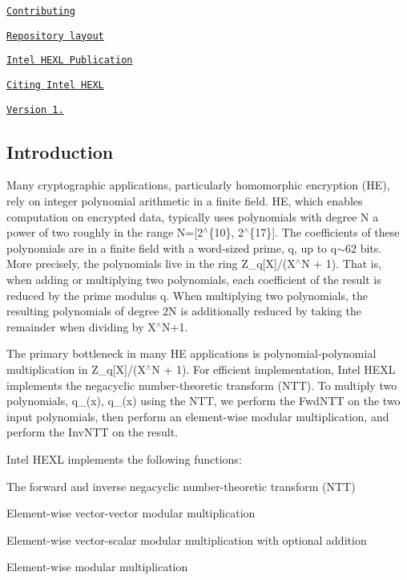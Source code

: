 \begin{DoxyItemize}
\item \href{#contributing}{\tt Contributing}
\begin{DoxyItemize}
\item \href{#repository-layout}{\tt Repository layout}
\item \href{#intel-hexl-publication}{\tt Intel H\+E\+XL Publication}
\item \href{#citing-intel-hexl}{\tt Citing Intel H\+E\+XL}
\begin{DoxyItemize}
\item \href{#version-10}{\tt Version 1.}
\end{DoxyItemize}
\end{DoxyItemize}
\end{DoxyItemize}

\subsection*{Introduction}

Many cryptographic applications, particularly homomorphic encryption (HE), rely on integer polynomial arithmetic in a finite field. HE, which enables computation on encrypted data, typically uses polynomials with degree {\ttfamily N} a power of two roughly in the range {\ttfamily N=\mbox{[}2$^\wedge$\{10\}, 2$^\wedge$\{17\}\mbox{]}}. The coefficients of these polynomials are in a finite field with a word-\/sized prime, {\ttfamily q}, up to {\ttfamily q}$\sim$62 bits. More precisely, the polynomials live in the ring {\ttfamily Z\+\_\+q\mbox{[}X\mbox{]}/(X$^\wedge$N + 1)}. That is, when adding or multiplying two polynomials, each coefficient of the result is reduced by the prime modulus {\ttfamily q}. When multiplying two polynomials, the resulting polynomials of degree {\ttfamily 2N} is additionally reduced by taking the remainder when dividing by {\ttfamily X$^\wedge$\+N+1}.

The primary bottleneck in many HE applications is polynomial-\/polynomial multiplication in {\ttfamily Z\+\_\+q\mbox{[}X\mbox{]}/(X$^\wedge$N + 1)}. For efficient implementation, Intel H\+E\+XL implements the negacyclic number-\/theoretic transform (N\+TT). To multiply two polynomials, {\ttfamily q\+\_(x), q\+\_(x)} using the N\+TT, we perform the Fwd\+N\+TT on the two input polynomials, then perform an element-\/wise modular multiplication, and perform the Inv\+N\+TT on the result.

Intel H\+E\+XL implements the following functions\+:
\begin{DoxyItemize}
\item The forward and inverse negacyclic number-\/theoretic transform (N\+TT)
\item Element-\/wise vector-\/vector modular multiplication
\item Element-\/wise vector-\/scalar modular multiplication with optional addition
\item Element-\/wise modular multiplication
\end{DoxyItemize}

